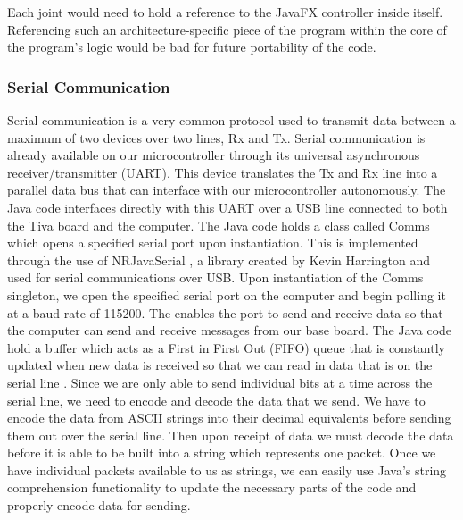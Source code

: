 \noindent Each joint would need to hold a reference to the JavaFX controller inside itself. Referencing such an architecture-specific piece of the program within the core of the program's logic would be bad for future portability of the code. 

\subsubsection{Serial Communication}
Serial communication is a very common protocol used to transmit data between a maximum of two devices over two lines, Rx and Tx. Serial communication is already available on our microcontroller through its universal asynchronous receiver/transmitter (UART). This device translates the Tx and Rx line into a parallel data bus that can interface with our microcontroller autonomously. The Java code interfaces directly with this UART over a USB line connected to both the Tiva board and the computer. The Java code holds a class called Comms which opens a specified serial port upon instantiation. This is implemented through the use of NRJavaSerial \cite{NRJavaSerial}, a library created by Kevin Harrington and used for serial communications over USB. Upon instantiation of the Comms singleton, we open the specified serial port on the computer and begin polling it at a baud rate of 115200. The enables the port to send and receive data so that the computer can send and receive messages from our base board. The Java code hold a buffer which acts as a First in First Out (FIFO) queue that is constantly updated when new data is received so that we can read in data that is on the serial line \cite{SerialSparkfun}.
Since we are only able to send individual bits at a time across the serial line, we need to encode and decode the data that we send.  We have to encode the data from ASCII strings into their decimal equivalents before sending them out over the serial line. Then upon receipt of data we must decode the data before it is able to be built into a string which represents one packet. Once we have individual packets available to us as strings, we can easily use Java's string comprehension functionality to update the necessary parts of the code and properly encode data for sending\cite{SerialSparkfun}.

